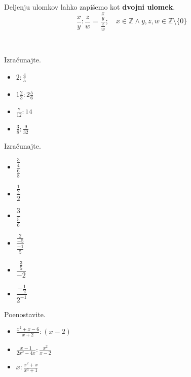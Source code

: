             
                Deljenju ulomkov lahko zapišemo kot \textbf{dvojni ulomek}.
                $$\dfrac{x}{y}:\dfrac{z}{w}=\dfrac{\frac{x}{y}}{\frac{z}{w}}; \quad x\in\mathbb{Z}\land y,z,w\in\mathbb{Z}\setminus\{0\} $$
            

                ~
        



        
            \begin{naloga}
                Izračunajte.
                \begin{itemize}
                    \item $2:\frac{4}{5}$ 
                    \item $1\frac{2}{3}:2\frac{5}{6}$ 
                    \item $\frac{7}{12}:14$ 
                    \item $\frac{3}{8}:\frac{9}{32}$ 
                \end{itemize}
            \end{naloga}
        


        
            \begin{naloga}
                Izračunajte.
                \begin{itemize}
                            \item $\dfrac{\frac{3}{4}}{\frac{6}{8}}$ 
                            \item $\dfrac{\frac{1}{2}}{2}$ 
                            \item $\dfrac{3}{\frac{5}{6}}$ 
                            \item $\dfrac{\frac{2}{-5}}{\frac{-1}{5}}$ 
                            \item $\dfrac{\frac{3}{5}}{-2}$ 
                            \item $\dfrac{-\frac{1}{2}}{2^{-1}}$ 

                \end{itemize}
            \end{naloga}
        


        
            \begin{naloga}
                Poenostavite.
                \begin{itemize}
                    \item $\frac{x^2+x-6}{x+2}:(x-2)$ 
                    \item $\frac{x-1}{2x^2-4x}:\frac{x^2}{x-2}$ 
                    \item $x:\frac{x^2+x}{x^3+1}$ 
                \end{itemize}
            \end{naloga}
        

